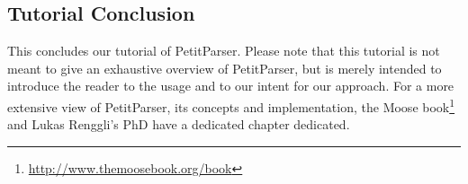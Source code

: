 \documentclass[a4paper,10pt,twoside]{book}
\begin{document}
\subsection{Tutorial Conclusion}

This concludes our tutorial of PetitParser. Please note that this
tutorial is not meant to give an exhaustive overview of PetitParser,
but is merely intended to introduce the reader to the usage and to our
intent for our approach. For a more extensive view of PetitParser, its
concepts and implementation, the Moose
book\footnote{\url{http://www.themoosebook.org/book}} and Lukas
Renggli's PhD have a dedicated chapter dedicated.

\ifx\wholebook\relax\else
   
   
\end{document}
